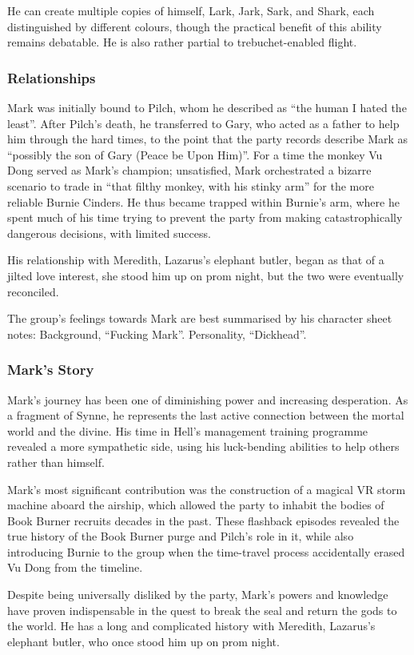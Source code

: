 He can create multiple copies of himself, Lark, Jark, Sark, and Shark, each distinguished by different colours, though the practical benefit of this ability remains debatable.  He is also rather partial to trebuchet-enabled flight.

\subsubsection{Relationships}

Mark was initially bound to Pilch, whom he described as ``the human I hated the least''.  After Pilch's death, he transferred to Gary, who acted as a father to help him through the hard times, to the point that the party records describe Mark as ``possibly the son of Gary (Peace be Upon Him)''.  For a time the monkey Vu Dong served as Mark's champion; unsatisfied, Mark orchestrated a bizarre scenario to trade in ``that filthy monkey, with his stinky arm'' for the more reliable Burnie Cinders.  He thus became trapped within Burnie's arm, where he spent much of his time trying to prevent the party from making catastrophically dangerous decisions, with limited success.

His relationship with Meredith, Lazarus's elephant butler, began as that of a jilted love interest, she stood him up on prom night, but the two were eventually reconciled.

The group's feelings towards Mark are best summarised by his character sheet notes: Background, ``Fucking Mark''.  Personality, ``Dickhead''.

\subsubsection{Mark's Story}

Mark's journey has been one of diminishing power and increasing desperation.  As a fragment of Synne, he represents the last active connection between the mortal world and the divine.  His time in Hell's management training programme revealed a more sympathetic side, using his luck-bending abilities to help others rather than himself.

Mark's most significant contribution was the construction of a magical VR storm machine aboard the airship, which allowed the party to inhabit the bodies of Book Burner recruits decades in the past.  These flashback episodes revealed the true history of the Book Burner purge and Pilch's role in it, while also introducing Burnie to the group when the time-travel process accidentally erased Vu Dong from the timeline.

Despite being universally disliked by the party, Mark's powers and knowledge have proven indispensable in the quest to break the seal and return the gods to the world.  He has a long and complicated history with Meredith, Lazarus's elephant butler, who once stood him up on prom night.

\clearpage
